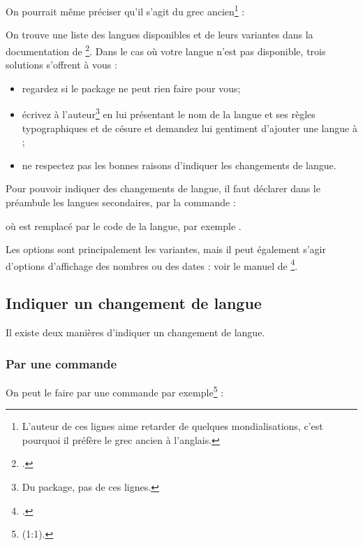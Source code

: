 On pourrait même préciser qu'il s'agit du grec ancien\footnote{L'auteur de ces lignes aime retarder de quelques mondialisations, c'est pourquoi il préfère le grec ancien à l'anglais.} : 

\begin{latexcode}
\setmainlanguage[variant=ancient]{greek}
\end{latexcode}


On trouve une liste des langues disponibles et de leurs variantes dans la documentation de \footcite{polyglossia}. Dans le cas où votre langue n'est pas disponible, trois solutions s'offrent à vous :
\begin{itemize}
\item regardez si le package  ne peut rien faire pour vous;
\item écrivez à l'auteur\footnote{Du package, pas de ces lignes.} en lui présentant le nom de la langue et ses règles typographiques et de césure et demandez lui gentiment d'ajouter une langue à ;
\item ne respectez pas les bonnes raisons d'indiquer les changements de langue.
\end{itemize}

Pour pouvoir indiquer des changements de langue, il faut déclarer dans le préambule les langues secondaires, par la commande : 


 où  est remplacé par le code de la langue, par exemple .

Les options sont principalement les variantes, mais il peut également s'agir d'options d'affichage des nombres ou des dates : voir le manuel de \footcite{polyglossia_options}.

\subsection{Indiquer un changement de langue}\label{changerlang}

Il existe deux manières d'indiquer un changement de langue.

\subsubsection{Par une commande}

On peut le faire par une commande 
 par exemple\footnote{(1:1).} : 

